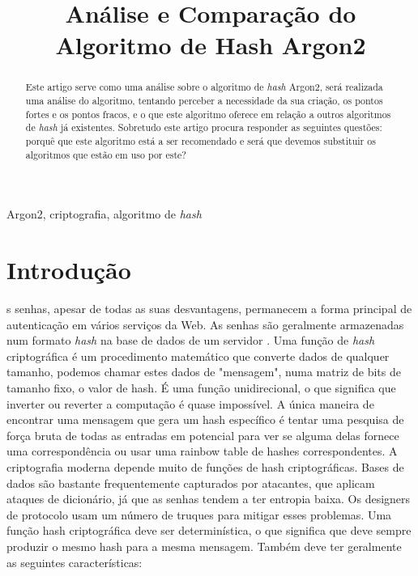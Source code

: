 \documentclass[conference]{IEEEtran}
\begin{document}
\title{Análise e Comparação do Algoritmo de Hash Argon2\\
}

\author{
}

\maketitle

\begin{abstract}
Este artigo serve como uma análise sobre o algoritmo de \textit{hash} Argon2, será realizada 
uma análise do algoritmo, tentando perceber a necessidade da sua criação, os pontos 
fortes e os pontos fracos, e o que este algoritmo oferece em relação a outros 
algoritmos de \textit{hash} já existentes. Sobretudo este artigo procura responder as 
seguintes questões: porquê que este algoritmo está a ser recomendado e será que 
devemos substituir os algoritmos que estão em uso por este?
\end{abstract}

\begin{IEEEkeywords}
Argon2, criptografia, algoritmo de \textit{hash}
\end{IEEEkeywords}

\section{Introdução}
s senhas, apesar de todas as suas desvantagens, permanecem a forma 
principal de autenticação em vários serviços da Web. 
As senhas são geralmente armazenadas num formato \textit{hash} na base de dados 
de um servidor \cite{argon2spec}. Uma função de \textit{hash} criptográfica é um procedimento matemático que 
converte dados de qualquer tamanho, podemos chamar estes dados de "mensagem", numa 
matriz de bits de tamanho fixo, o valor de hash. É uma função unidirecional, o que 
significa que inverter ou reverter a computação é quase impossível. A única maneira 
de encontrar uma mensagem que gera um hash específico é tentar uma pesquisa de força 
bruta de todas as entradas em potencial para ver se alguma delas fornece uma correspondência 
ou usar uma rainbow table de hashes correspondentes. A criptografia moderna depende 
muito de funções de hash criptográficas.
Bases de dados são bastante frequentemente capturados 
por atacantes, que aplicam ataques de dicionário, já que as senhas 
tendem a ter entropia baixa. Os designers de protocolo usam um número de 
truques para mitigar esses problemas. 
Uma função hash criptográfica deve ser determinística, o que significa que deve sempre produzir o 
mesmo hash para a mesma mensagem. Também deve ter geralmente as seguintes características: 
\end{document}
